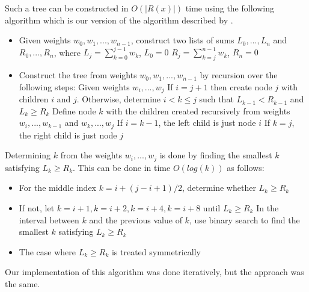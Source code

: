 Such a tree can be constructed in $O(|R(x)|)$ time using the following algorithm which is our version of the algorithm described by .

\begin{itemize}
	\item Given weights ${w_0, w_1, ..., w_{n-1}}$, construct two lists of sums ${L_0, ..., L_{n}}$ and ${R_0, ..., R_{n}}$, where
	\subitem $L_j=\sum_{k=0}^{j-1} w_k$, $L_0=0$
	\subitem $R_j=\sum_{k=j}^{n-1} w_k$, $R_{n}=0$
	\item Construct the tree from weights ${w_0, w_1, ..., w_{n-1}}$ by recursion over the following steps:
	\subitem Given weights ${w_i, ..., w_j}$
	\subitem If $i=j+1$ then create node $j$ with children $i$ and $j$.
	\subitem Otherwise, determine $i<k\le j$ such that
	\subsubitem $L_{k-1} < R_{k-1}$ and $L_k \ge R_k$
	\subitem Define node $k$ with the children created recursively from weights
	\subsubitem ${w_i, ..., w_{k-1}}$ and ${w_k, ..., w_j}$
	\subsubitem If $i=k-1$, the left child is just node $i$
	\subsubitem If $k=j$, the right child is just node $j$
\end{itemize}

Determining $k$ from the weights ${w_i, ..., w_j}$ is done by finding the smallest $k$ satisfying $L_k \ge R_k$. This can be done in time $O(log(k))$ as follows:

\begin{itemize}
	\item For the middle index $k=i+(j-i+1)/2$, determine whether $L_k \ge R_k$
	\item If not, let $k=i+1, k=i+2, k=i+4, k=i+8$ until $L_k \ge R_k$
	\subitem In the interval between $k$ and the previous value of $k$, use binary search to find the smallest $k$ satisfying $L_k \ge R_k$
	\item The case where $L_k \ge R_k$ is treated symmetrically
\end{itemize}

Our implementation of this algorithm was done iteratively, but the approach was the same.






